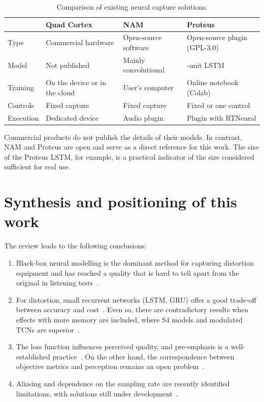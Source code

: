 \documentclass[ENG]{TFUOC}%
\begin{document}
\begin{table}[H]
\centering
\caption{Comparison of existing neural capture solutions.}
\label{tab:solucions}
\small
\begin{tabularx}{\textwidth}{>{\raggedright\arraybackslash}X>{\raggedright\arraybackslash}X>{\raggedright\arraybackslash}X>{\raggedright\arraybackslash}X}
\toprule
& \textbf{Quad Cortex} & \textbf{NAM} & \textbf{Proteus} \\
\midrule
Type & Commercial hardware & Open-source software & Open-source plugin (GPL-3.0) \\
Model & Not published & Mainly convolutional & 40-unit LSTM \\
Training & On the device or in the cloud & User's computer & Online notebook (Colab) \\
Controls & Fixed capture & Fixed capture & Fixed or one control \\
Execution & Dedicated device & Audio plugin & Plugin with RTNeural \\
\bottomrule
\end{tabularx}
\end{table}

Commercial products do not publish the details of their models. In contrast, NAM and Proteus are open and serve as a direct reference for this work. The size of the Proteus LSTM, for example, is a practical indicator of the size considered sufficient for real use.

\section{Synthesis and positioning of this work}
\label{s:sintesi}

The review leads to the following conclusions:
\begin{enumerate}[nosep]
    \item Black-box neural modelling is the dominant method for capturing distortion equipment and has reached a quality that is hard to tell apart from the original in listening tests~\cite{wright2020,cassidy2023,juvela2023}.
    \item For distortion, small recurrent networks (LSTM, GRU) offer a good trade-off between accuracy and cost~\cite{wright2019,simionato2025}. Even so, there are contradictory results when effects with more memory are included, where S4 models and modulated TCNs are superior~\cite{comunita2023,comunita2025}.
    \item The loss function influences perceived quality, and pre-emphasis is a well-established practice~\cite{wright2020percep}. On the other hand, the correspondence between objective metrics and perception remains an open problem~\cite{wright2020percep,cassidy2023}.
    \item Aliasing and dependence on the sampling rate are recently identified limitations, with solutions still under development~\cite{carson2024,carson2025}.
\end{enumerate}
\end{document}
